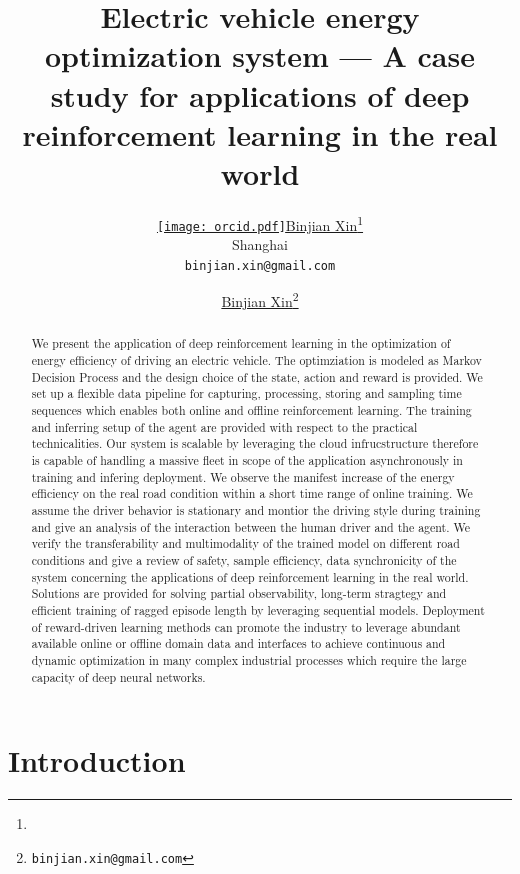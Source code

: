 \documentclass{article}
\title{Electric vehicle energy optimization system --- A case study for applications of deep reinforcement learning in the real world}
\author{ \href{https://orcid.org/0009-0003-0705-2612}{\texttt{[image: orcid.pdf]}\hspace{1mm}Binjian Xin}\thanks{} \\
	Shanghai\\
	\texttt{binjian.xin@gmail.com} \\
}
\author[1]{%
	\href{https://orcid.org/0009-0003-0705-2612}{\usebox{\orcid}\hspace{1mm}Binjian Xin\thanks{\texttt{binjian.xin@gmail.com}}}%
}
\affil[1]{}
\begin{document}
\maketitle

\begin{abstract}
	We present the application of deep reinforcement learning in the optimization of energy efficiency of driving an electric vehicle. The optimziation is modeled as Markov Decision Process and the design choice of the state, action and reward is provided. We set up a flexible data pipeline for capturing, processing, storing and sampling time sequences which enables both online and offline reinforcement learning. The training and inferring setup of the agent are provided with respect to the practical technicalities. Our system is scalable by leveraging the cloud infrucstructure therefore is capable of handling a massive fleet in scope of the application asynchronously in training and infering deployment. We observe the manifest increase of the energy efficiency on the real road condition within a short time range of online training. We assume the driver behavior is stationary and montior the driving style during training and give an analysis of the interaction between the human driver and the agent. We verify the transferability and multimodality of the trained model on different road conditions and give a review of safety, sample efficiency, data synchronicity of the system concerning the applications of deep reinforcement learning in the real world. Solutions are provided for solving partial observability, long-term stragtegy and efficient training of ragged episode length by leveraging sequential models. Deployment of reward-driven learning methods can promote the industry to leverage abundant available online or offline domain data and interfaces to achieve continuous and dynamic optimization in many complex industrial processes which require the large capacity of deep neural networks.
\end{abstract}


\section{Introduction}\label{sec:intro}
\end{document}
